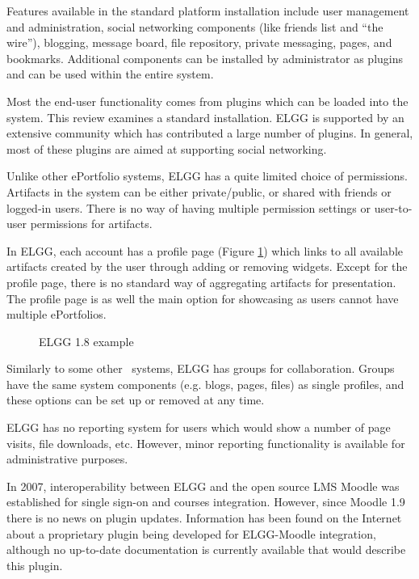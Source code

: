 Features available in the standard platform installation include user management
and administration, social networking components (like friends list and ``the
wire''), blogging, message board, file repository, private messaging, pages, and
bookmarks. Additional components can be installed by administrator as plugins
and can be used within the entire system.

Most the end-user functionality comes from plugins which can be loaded into the
system. This review examines a standard installation. ELGG is supported by an
extensive community which has contributed a large number of plugins. In general,
most of these plugins are aimed at supporting social networking.

Unlike other ePortfolio systems, ELGG has a quite limited choice of permissions.
Artifacts in the system can be either private/public, or shared with friends
or logged-in users. There is no way of having multiple permission settings or
user-to-user permissions for artifacts.

In ELGG, each account has a profile page (Figure \ref{fig:elgg}) which links to
all available artifacts created by the user through adding or removing widgets.
Except for the profile page, there is no standard way of aggregating artifacts
for presentation. The profile page is as well the main option for showcasing as
users cannot have multiple ePortfolios.

\begin{figure}[htb]
\centering
\setlength\fboxsep{0pt}
\setlength\fboxrule{0.5pt}
\caption{ELGG 1.8 example}
\label{fig:elgg}
\end{figure}

Similarly to some other \ep~systems, ELGG has groups for collaboration. Groups
have the same system components (e.g. blogs, pages, files) as single profiles,
and these options can be set up or removed at any time.

ELGG has no reporting system for users which would show a number of page
visits, file downloads, etc. However, minor reporting functionality is available
for administrative purposes.

In 2007, interoperability between ELGG and the open source LMS Moodle was
established for single sign-on and courses integration. However, since Moodle
1.9 there is no news on plugin updates. Information has been found on the
Internet about a proprietary plugin being developed for ELGG-Moodle integration,
although no up-to-date documentation is currently available that would describe
this plugin.
 
